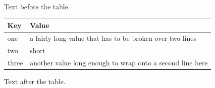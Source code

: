 \documentclass[12pt]{article}
\begin{document}
Text before the table.

\begin{longtable}{|l|p{4cm}|}
\hline Key & Value\\\hline
\endfirsthead
\hline
\endlastfoot
one & a fairly long value that has to be broken over two lines\\
two & short\\
three & another value long enough to wrap onto a second line here\\
\end{longtable}

Text after the table.
\end{document}
